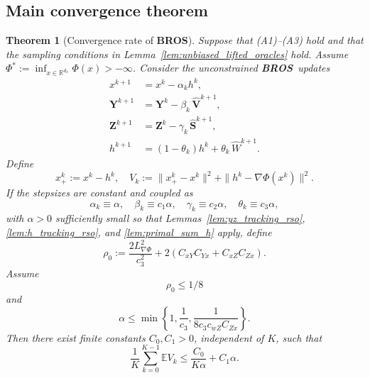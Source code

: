 \documentclass{pkumelon}
\theoremstyle{plain}
\newtheorem{theorem}{Theorem}
\newcommand{\R}{\mathbb{R}}
\newcommand{\E}{\mathbb{E}}
\newcommand{\Phiobj}{\Phi}
\newcommand{\oursname}{\textnormal{\textbf{BROS}}}
\newcommand{\ours}{\oursname\ }
\newcommand{\ourslast}{\oursname}
\begin{document}
\subsection{Main convergence theorem}

\begin{theorem}[Convergence rate of \ourslast]\label{thm:rso_masoba_convergence}
Suppose that \emph{(A1)}--\emph{(A3)} hold and that the sampling conditions in Lemma~\ref{lem:unbiased_lifted_oracles} hold. Assume $\Phiobj^*:=\inf_{x\in\R^{d_x}}\Phiobj(x)>-\infty$. Consider the unconstrained \ours updates
\begin{equation*}
\begin{aligned}
x^{k+1}&=x^k-\alpha_k h^k,\\
\boldsymbol Y^{k+1}&=\boldsymbol Y^k-\beta_k\,\widehat{\boldsymbol V}^{k+1},\\
\boldsymbol Z^{k+1}&=\boldsymbol Z^k-\gamma_k\,\widehat{\boldsymbol S}^{k+1},\\
h^{k+1}&=(1-\theta_k)h^k+\theta_k\,\widehat W^{k+1}.
\end{aligned}
\end{equation*}
Define
\begin{equation*}
x_+^k:=x^k-h^k, \quad V_k:=\|x_+^k-x^k\|^2+\|h^k-\nabla\Phiobj(x^k)\|^2.
\end{equation*}
If the stepsizes are constant and coupled as
\begin{equation*}
\alpha_k\equiv \alpha,\quad \beta_k\equiv c_1\alpha,\quad \gamma_k\equiv c_2\alpha,\quad \theta_k\equiv c_3\alpha,
\end{equation*}
with $\alpha>0$ sufficiently small so that Lemmas~\ref{lem:yz_tracking_rso}, \ref{lem:h_tracking_rso}, and \ref{lem:primal_sum_h} apply, define
\begin{equation}\label{eq:def_rho0_matrix_thm}
\rho_0:=\frac{2L_{\nabla\Phi}^2}{c_3^2}+2(C_{xY}C_{Yx}+C_{xZ}C_{Zx}).
\end{equation}
Assume
\begin{equation}\label{eq:rho0_condition_matrix_thm}
\rho_0\le 1/8
\end{equation}
and
\begin{equation}\label{eq:thm_extra_stepsize_cond}
\alpha\le \min\left\{1,\frac{1}{c_3},\frac{1}{8c_3c_{wZ}C_{Zx}}\right\}.
\end{equation}
Then there exist finite constants $C_0,C_1>0$, independent of $K$, such that
\begin{equation}\label{eq:thm_rso_masoba_V_rate_generic}
\frac{1}{K}\sum_{k=0}^{K-1}\E V_k
\le \frac{C_0}{K\alpha}+C_1\alpha.

\end{equation}
\end{theorem}
\end{document}
